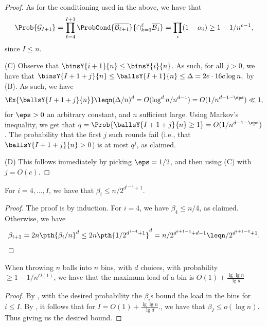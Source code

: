 \begin{proof}

    As for the conditioning used in the above, we have that
    \begin{equation*}
        \Prob{\GoodEvent_{I+1}}%
        =%
        \prod_{\ell=4}^{I+1} \ProbCond{\overline{\BadEvent_{\ell+1}}}{
           \cap_{k=1}^\ell\overline{\BadEvent_{1}}}
        =%
        \prod_i
        (1-\alpha_i) \geq 1-1/n^{c-1},        
    \end{equation*}
    since $I \leq n$.

    \medskip%
    (C) Observe that $\binsY{i+1}{n} \leq \binsY{i}{n}$. As such, for
    all $j > 0$, we have that
    \begin{math}
        \binsY{I+1+j}{n}%
        \leq \ballsY{I+1}{n}%
        \leq \Delta = 2e \cdot 16 c \log n,
    \end{math}
    by (B).  As such, we have
    \begin{equation*}
        \Ex{ \ballsY{I+1+j}{n} }%
        \leq%
        n(\Delta/n)^d %
        =%
        O( \log^d n / n^{d-1})
        =%
        O(1/n^{d-1-\eps}) \ll 1,
    \end{equation*}
    for $\eps > 0$ an arbitrary constant, and $n$ sufficient large.
    Using Markov's inequality, we get that
    $q = \Prob{\ballsY{I+1+j}{n} \geq 1} = O(1/n^{d-1-\eps})$. The
    probability that the first $j$ such rounds fail (i.e., that
    $\ballsY{I+1+j}{n} > 0$) is at most $q^j$, as claimed.

    \smallskip%

    (D) This follows immediately by picking $\eps = 1/2$, and then
    using (C) with $j = O(c)$.
\end{proof}


\begin{lemma}
    For $i=4,\ldots, I$, we have that $\beta_i \leq n/2^{d^{i-4}+1}$.
\end{lemma}
\begin{proof}
    The proof is by induction. For $i=4$, we have $\beta_4 \leq n/4$,
    as claimed. Otherwise, we have
    \begin{equation*}
        \beta_{i+1}%
        =%
        2 n \pth{\beta_i/n}^d%
        \leq%
        2n \pth{1/2^{d^{i-4} + 1}}^d
        =%
        n /2^{d^{i+1-4} + d - 1}
        \leq%
        n /2^{d^{i+1-4} + 1}.
    \end{equation*}
\end{proof}

\begin{theorem}
    When throwing $n$ balls into $n$ bins, with $d$ choices, with
    probability $\geq 1-1/n^{O(1)}$, we have that the maximum load of
    a bin is $O(1) + \tfrac{\lg \lg n}{\lg d} $
\end{theorem}
\begin{proof}
    By , with the desired probability the
    $\beta_i$s bound the load in the bins for $i \leq I$.  By
    , it follows that for
    $I = O(1) + \tfrac{\lg \lg n}{\lg d}\Bigr.$, we have that
    $\beta_I \leq o(\log n)$. Thus giving us the desired bound.
\end{proof}

